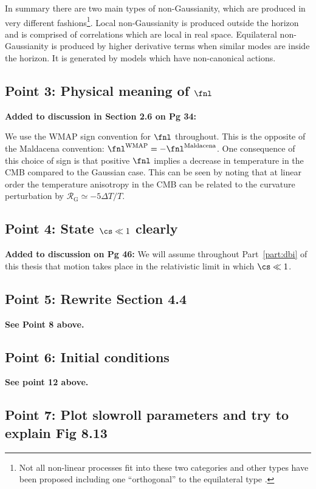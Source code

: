 In summary there are two main types of non-Gaussianity, which are produced in very different
fashions\footnote{Not all non-linear processes fit into these two categories and other types have
been proposed including one ``orthogonal'' to the equilateral type \cite{Senatore:2009gt}.}. Local
non-Gaussianity is produced outside the horizon and is comprised of correlations which are local in
real space. Equilateral non-Gaussianity is produced by higher derivative terms when similar modes
are inside the horizon. It is generated by models which have non-canonical actions.


\subsection{Point 3: Physical meaning of $\fnl$}
\textbf{Added to discussion in Section 2.6 on Pg 34:}

We use the WMAP sign convention for $\fnl$ throughout. 
This is the opposite of the Maldacena convention:
$\fnl^\mathrm{WMAP}=-\fnl^\mathrm{Maldacena}$. One consequence of this choice of sign is that
positive $\fnl$ implies a decrease in temperature in the CMB compared to the Gaussian case. This
can be seen by noting that at linear order the temperature anisotropy in the CMB can be related to
the curvature perturbation by $\mathcal{R}_\mathrm{G}\simeq -5 \Delta T/T$.

\subsection{Point 4: State $\cs\ll 1$ clearly}
\textbf{Added to discussion on Pg 46:}
We will assume throughout Part~\ref{part:dbi} of this thesis that motion takes
place in the relativistic limit in which $\cs\ll1$.

\subsection{Point 5: Rewrite Section 4.4}
\textbf{See Point 8 above.}

\subsection{Point 6: Initial conditions}
\textbf{See point 12 above.}

\subsection{Point 7: Plot slowroll parameters and try to explain Fig 8.13}

